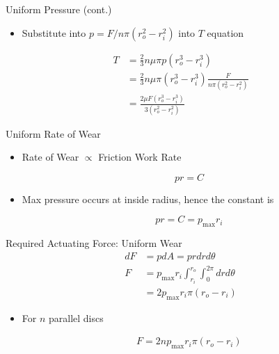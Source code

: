 \documentclass[10pt, svgnames]{beamer}
\begin{document}
\begin{frame}[label={sec:org306ac0c}]{Uniform Pressure (cont.)}
\begin{itemize}
\item Substitute into \(p = F / n \pi (r_o^2 - r_i^2)\) into \(T\) equation
\end{itemize}

\begin{align*}
T &= \frac{2}{3} n \mu \pi p \left( r_o^3 - r_i^3 \right) \\
&= \frac{2}{3} n \mu \pi \left( r_o^3 - r_i^3 \right) \frac{F}{n \pi (r_o^2 - r_i^2)} \\
&= \frac{2\mu F \left( r_o^3 - r_i^3 \right)}{3 \left( r_o^2 - r_i^2 \right)}
\end{align*}
\end{frame}

\begin{frame}[label={sec:org1eb312b}]{Uniform Rate of Wear}
\begin{itemize}
\item Rate of Wear \(\propto\) Friction Work Rate

$$ pr = C $$

\item Max pressure occurs at inside radius, hence the constant is

$$ pr = C = p_{\max}r_i $$
\end{itemize}
\end{frame}

\begin{frame}[label={sec:orgf06445e}]{Required Actuating Force: Uniform Wear}
\begin{align*}
    dF &= pdA = prdrd\theta \\
     F &= p_{\max} r_{i} \int_{r_{i}}^{r_{o}} \int_{0}^{2\pi} dr d\theta \\
       &= 2p_{\max} r_{i} \pi(r_{o} - r_{i})
\end{align*}

\begin{itemize}
\item For \(n\) parallel discs

\begin{align*}
  F = 2np_{\max}r_{i} \pi(r_{o} - r_{i})
\end{align*}
\end{itemize}
\end{frame}
\end{document}
